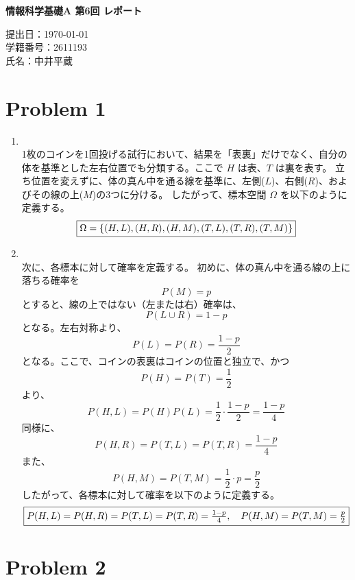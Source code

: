 \documentclass[11pt,a4paper]{jlreq}
\begin{document}
\begin{center}
{\LARGE \textbf{情報科学基礎A 第6回 レポート}}
\end{center}
\vspace{1em}

\begin{flushright}
提出日：\today \\
学籍番号：2611193 \\
氏名：中井平蔵
\end{flushright}

\section*{Problem 1}
\begin{enumerate}
    \item[(1)]\leavevmode\\
    1枚のコインを1回投げる試行において、結果を「表裏」だけでなく、自分の体を基準とした左右位置でも分類する。ここで $H$ は表、$T$ は裏を表す。
    立ち位置を変えずに、体の真ん中を通る線を基準に、左側($L$)、右側($R$)、およびその線の上($M$)の3つに分ける。
    したがって、標本空間 $\Omega$ を以下のように定義する。
    \[
    \fbox{$\Omega = \{(H,L), (H,R), (H,M), (T,L), (T,R), (T,M)\}$}
    \]

    \item[(2)]\leavevmode\\
    次に、各標本に対して確率を定義する。
    初めに、体の真ん中を通る線の上に落ちる確率を
    \[
    P(M)=p
    \]
    とすると、線の上ではない（左または右）確率は、
    \[
    P(L\cup R)=1-p
    \]
    となる。左右対称より、
    \[
    P(L)=P(R)=\frac{1-p}{2}
    \]
    となる。ここで、コインの表裏はコインの位置と独立で、かつ
    \[
    P(H)=P(T)=\frac12
    \]
    より、
    \[
    P(H,L)=P(H)P(L)=\frac12\cdot\frac{1-p}{2}=\frac{1-p}{4}
    \]
    同様に、
    \[
    P(H,R)=P(T,L)=P(T,R)=\frac{1-p}{4}
    \]
    また、
    \[
    P(H,M)=P(T,M)=\frac12\cdot p=\frac{p}{2}
    \]
    したがって、各標本に対して確率を以下のように定義する。
    \[
    \fbox{$P(H,L)=P(H,R)=P(T,L)=P(T,R)=\frac{1-p}{4},\quad P(H,M)=P(T,M)=\frac{p}{2}$}
    \]
\end{enumerate}

\section*{Problem 2}
\end{document}
